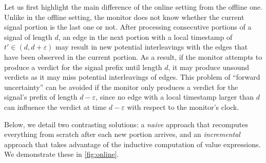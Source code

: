 Let us first highlight the main difference of the online setting from the offline one.
Unlike in the offline setting, the monitor does not know whether the current signal portion is the last one or not.
After processing consecutive portions of a signal of length $d$, an edge in the next portion with a local timestamp of $t' \in (d, d+\varepsilon)$ may result in new potential interleavings with the edges that have been observed in the current portion.
As a result, if the monitor attempts to produce a verdict for the signal prefix until length $d$, it may produce unsound verdicts as it may miss potential interleavings of edges.
This problem of ``forward uncertainty'' can be avoided if the monitor only produces a verdict for the signal's prefix of length $d-\varepsilon$, since no edge with a local timestamp larger than $d$ can influence the verdict at time $d-\varepsilon$ with respect to the monitor's clock.

Below, we detail two contrasting solutions: a \emph{naive} approach that recomputes everything from scratch after each new portion arrives, and an \emph{incremental} approach that takes advantage of the inductive computation of value expressions.
We demonstrate these in \cref{fig:online}.

